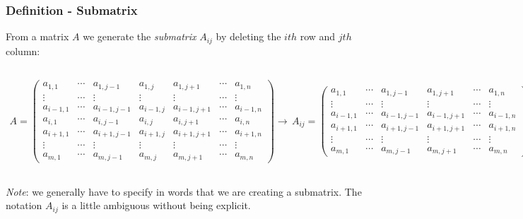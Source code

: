 \documentclass[usenames,dvipsnames,aspectratio=169,10pt]{beamer}
\numberwithin{equation}{section}
\begin{document}
\begin{frame}
\frametitle{Definition - Submatrix}
From a matrix $A$ we generate the \textit{submatrix} $A_{ij}$ by deleting the $ith$ row and $jth$ column:

\begin{columns}\column{\dimexpr\paperwidth-1pt}
\fontsize{7.8pt}{12pt}\selectfont
\begin{align*}
A =
\begin{pmatrix}
a_{1,1}   & \cdots & a_{1,j-1}   & a_{1,j}   & a_{1,j+1}   & \cdots & a_{1,n}   \\
\vdots    & \cdots & \vdots      & \vdots    & \vdots      & \cdots & \vdots    \\
a_{i-1,1} & \cdots & a_{i-1,j-1} & a_{i-1,j} & a_{i-1,j+1} & \cdots & a_{i-1,n} \\
a_{i,1}   & \cdots & a_{i,j-1}   & a_{i,j}   & a_{i,j+1}   & \cdots & a_{i,n}   \\
a_{i+1,1} & \cdots & a_{i+1,j-1} & a_{i+1,j} & a_{i+1,j+1} & \cdots & a_{i+1,n} \\
\vdots    & \cdots & \vdots      & \vdots    & \vdots      & \cdots & \vdots    \\
a_{m,1}   & \cdots & a_{m,j-1}   & a_{m,j}   & a_{m,j+1}   & \cdots & a_{m,n} 
\end{pmatrix} 
\to \, A_{ij} =
\begin{pmatrix}
a_{1,1}   & \cdots & a_{1,j-1}   & a_{1,j+1}   & \cdots & a_{1,n}   \\
\vdots    & \cdots & \vdots      & \vdots      & \cdots & \vdots    \\
a_{i-1,1} & \cdots & a_{i-1,j-1} & a_{i-1,j+1} & \cdots & a_{i-1,n} \\
a_{i+1,1} & \cdots & a_{i+1,j-1} & a_{i+1,j+1} & \cdots & a_{i+1,n} \\
\vdots    & \cdots & \vdots      & \vdots      & \cdots & \vdots    \\
a_{m,1}   & \cdots & a_{m,j-1}   & a_{m,j+1}   & \cdots & a_{m,n} 
\end{pmatrix}
\end{align*}
\fontsize{10pt}{10pt}\selectfont
\end{columns}

\textit{Note}: we generally have to specify in words that we are creating a submatrix. The notation $A_{ij}$ is a little ambiguous without being explicit. 
\end{frame}
\end{document}
